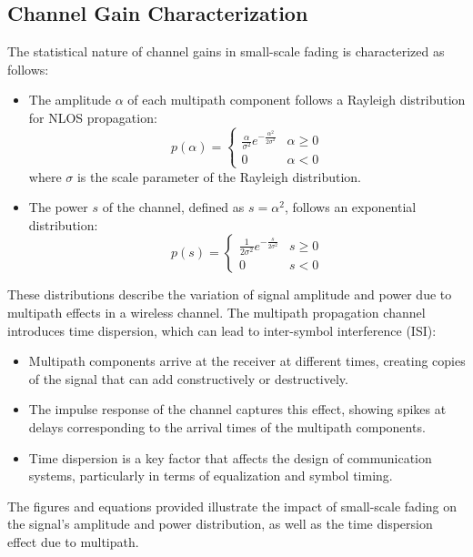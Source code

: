 \subsection*{Channel Gain Characterization}

The statistical nature of channel gains in small-scale fading is characterized as follows:

\begin{itemize}
    \item The amplitude \( \alpha \) of each multipath component follows a Rayleigh distribution for NLOS propagation:
    \[
    p(\alpha) = \begin{cases} 
    \frac{\alpha}{\sigma^2} e^{-\frac{\alpha^2}{2\sigma^2}} & \alpha \geq 0 \\
    0 & \alpha < 0
    \end{cases}
    \]
    where \( \sigma \) is the scale parameter of the Rayleigh distribution.

    \item The power \( s \) of the channel, defined as \( s = \alpha^2 \), follows an exponential distribution:
    \[
    p(s) = \begin{cases} 
    \frac{1}{2\sigma^2} e^{-\frac{s}{2\sigma^2}} & s \geq 0 \\
    0 & s < 0
    \end{cases}
    \]
\end{itemize}

These distributions describe the variation of signal amplitude and power due to multipath effects in a wireless channel.
The multipath propagation channel introduces time dispersion, which can lead to inter-symbol interference (ISI):

\begin{itemize}
    \item Multipath components arrive at the receiver at different times, creating copies of the signal that can add constructively or destructively.
    \item The impulse response of the channel captures this effect, showing spikes at delays corresponding to the arrival times of the multipath components.
    \item Time dispersion is a key factor that affects the design of communication systems, particularly in terms of equalization and symbol timing.
\end{itemize}
The figures and equations provided illustrate the impact of small-scale fading on the signal's amplitude and power distribution, as well as the time dispersion effect due to multipath.



